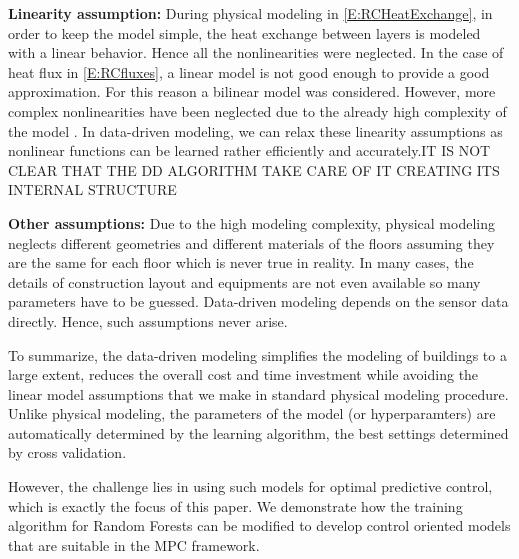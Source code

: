 \begin{enumerate}
	\item \textcolor[rgb]{0,0,1}{\textbf{Linearity assumption:} 
	During physical modeling in \eqref{E:RCHeatExchange}, in order to keep the model simple, the heat exchange between layers is modeled with a linear behavior. 
	Hence all the nonlinearities were neglected.
	In the case of heat flux in \eqref{E:RCfluxes}, a linear model is not good enough to provide a good approximation. For this reason a bilinear model was considered.
	However, more complex nonlinearities have been neglected due to the already high complexity of the model \cite{Sturzenegger2016}. 
	In data-driven modeling, we can relax these linearity assumptions as nonlinear functions can be learned rather efficiently and accurately.\textcolor[rgb]{1,0,0}{IT IS NOT CLEAR THAT THE DD ALGORITHM TAKE CARE OF IT CREATING ITS INTERNAL STRUCTURE}
	\item \textbf{Other assumptions:} 
	Due to the high modeling complexity, physical modeling neglects different geometries and different materials of the floors assuming they are the same for each floor which is never true in reality.
	In many cases, the details of construction layout and equipments are not even available so many parameters have to be guessed.
	Data-driven modeling depends on the sensor data directly. 
	Hence, such assumptions never arise.}
	
\end{enumerate}

\textcolor[rgb]{0,0,1}{To summarize, the data-driven modeling simplifies the modeling of buildings to a large extent, reduces the overall cost and time investment while avoiding the linear model assumptions that we make in standard physical modeling procedure. Unlike physical modeling, the parameters of the model (or hyperparamters) are automatically determined by the learning algorithm, the best settings determined by cross validation.}

\textcolor[rgb]{0,0,1}{However, the challenge lies in using such models for optimal predictive control, which is exactly the focus of this paper.
We demonstrate how the training algorithm for Random Forests can be modified to develop control oriented models that are suitable in the MPC framework.}


